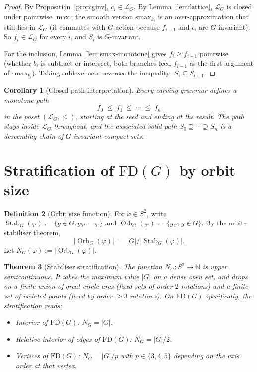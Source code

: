 \documentclass[11pt]{article}
\newtheorem{theorem}{Theorem}
\newtheorem{corollary}[theorem]{Corollary}
\theoremstyle{definition}
\newtheorem{definition}[theorem]{Definition}
\DeclareMathOperator{\Stab}{Stab}
\DeclareMathOperator{\Orb}{Orb}
\begin{document}
\begin{proof}
By Proposition~\ref{prop:ginv}, $c_i \in \mathcal{L}_G$.
By Lemma~\ref{lem:lattice}, $\mathcal{L}_G$ is closed under pointwise
$\max$; the smooth version $\mathrm{smax}_{k_i}$ is an over-approximation
that still lies in $\mathcal{L}_G$ (it commutes with $G$-action because
$f_{i-1}$ and $c_i$ are $G$-invariant). So $f_i \in \mathcal{L}_G$ for
every $i$, and $S_i$ is $G$-invariant.

For the inclusion, Lemma~\ref{lem:smax-monotone} gives $f_i \ge f_{i-1}$
pointwise (whether $b_i$ is subtract or intersect, both branches feed
$f_{i-1}$ as the first argument of $\mathrm{smax}_{k_i}$). Taking
sublevel sets reverses the inequality: $S_i \subseteq S_{i-1}$.
\end{proof}

\begin{corollary}[Closed path interpretation]
Every carving grammar defines a monotone path
\[
  f_0 \;\le\; f_1 \;\le\; \cdots \;\le\; f_n
\]
in the poset $(\mathcal{L}_G, \le)$, starting at the seed and ending at
the result. The path stays inside $\mathcal{L}_G$ throughout, and the
associated solid path $S_0 \supseteq \cdots \supseteq S_n$ is a
descending chain of $G$-invariant compact sets.
\end{corollary}

\section{Stratification of $\mathrm{FD}(G)$ by orbit size}
\label{sec:strat}

\begin{definition}[Orbit size function]
For $\varphi \in S^2$, write $\Stab_G(\varphi) := \{g \in G : g\varphi
= \varphi\}$ and $\Orb_G(\varphi) := \{g\varphi : g \in G\}$. By the
orbit--stabiliser theorem,
\[
  |\Orb_G(\varphi)| \;=\; |G| / |\Stab_G(\varphi)|.
\]
Let $N_G(\varphi) := |\Orb_G(\varphi)|$.
\end{definition}

\begin{theorem}[Stabiliser stratification]
\label{thm:strat}
The function $N_G : S^2 \to \mathbb{N}$ is upper semicontinuous. It
takes the maximum value $|G|$ on a dense open set, and drops on a
finite union of great-circle arcs (fixed sets of order-$2$ rotations)
and a finite set of isolated points (fixed by order $\ge 3$ rotations).
On $\mathrm{FD}(G)$ specifically, the stratification reads:
\begin{itemize}
\item Interior of $\mathrm{FD}(G)$: $N_G = |G|$.
\item Relative interior of edges of $\mathrm{FD}(G)$: $N_G = |G|/2$.
\item Vertices of $\mathrm{FD}(G)$: $N_G = |G|/p$ with
      $p \in \{3, 4, 5\}$ depending on the axis order at that vertex.
\end{itemize}
\end{theorem}
\end{document}
